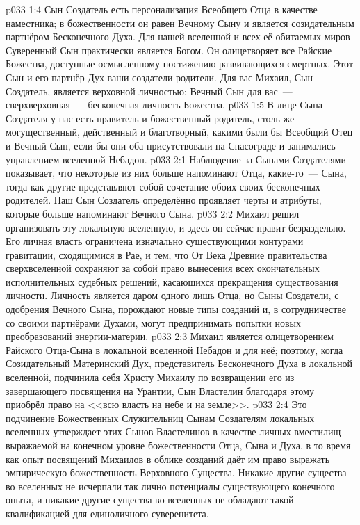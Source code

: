 \vs p033 1:4 Сын Создатель есть персонализация Всеобщего Отца в качестве наместника; в божественности он равен Вечному Сыну и является созидательным партнёром Бесконечного Духа. Для нашей вселенной и всех её обитаемых миров Суверенный Сын практически является Богом. Он олицетворяет все Райские Божества, доступные осмысленному постижению развивающихся смертных. Этот Сын и его партнёр Дух  ваши создатели\hyp{}родители. Для вас Михаил, Сын Создатель, является верховной личностью; Вечный Сын для вас~--- сверхверховная~--- бесконечная личность Божества.
\vs p033 1:5 \pc В лице Сына Создателя у нас есть правитель и божественный родитель, столь же могущественный, действенный и благотворный, какими были бы Всеобщий Отец и Вечный Сын, если бы они оба присутствовали на Спасограде и занимались управлением вселенной Небадон.
\vs p033 2:1 Наблюдение за Сынами Создателями показывает, что некоторые из них больше напоминают Отца, какие\hyp{}то~--- Сына, тогда как другие представляют собой сочетание обоих своих бесконечных родителей. Наш Сын Создатель определённо проявляет черты и атрибуты, которые больше напоминают Вечного Сына.
\vs p033 2:2 Михаил решил организовать эту локальную вселенную, и здесь он сейчас правит безраздельно. Его личная власть ограничена изначально существующими контурами гравитации, сходящимися в Рае, и тем, что От Века Древние правительства сверхвселенной сохраняют за собой право вынесения всех окончательных исполнительных судебных решений, касающихся прекращения существования личности. Личность является даром одного лишь Отца, но Сыны Создатели, с одобрения Вечного Сына, порождают новые типы созданий и, в сотрудничестве со своими партнёрами Духами, могут предпринимать попытки новых преобразований энергии\hyp{}материи.
\vs p033 2:3 \pc Михаил является олицетворением Райского Отца\hyp{}Сына в локальной вселенной Небадон и для неё; поэтому, когда Созидательный Материнский Дух, представитель Бесконечного Духа в локальной вселенной, подчинила себя Христу Михаилу по возвращении его из завершающего посвящения на Урантии, Сын Властелин благодаря этому приобрёл право на <<всю власть на небе и на земле>>.
\vs p033 2:4 Это подчинение Божественных Служительниц Сынам Создателям локальных вселенных утверждает этих Сынов Властелинов в качестве личных вместилищ выражаемой на конечном уровне божественности Отца, Сына и Духа, в то время как опыт посвящений Михаилов в облике созданий даёт им право выражать эмпирическую божественность Верховного Существа. Никакие другие существа во вселенных не исчерпали так лично потенциалы существующего конечного опыта, и никакие другие существа во вселенных не обладают такой квалификацией для единоличного суверенитета.
